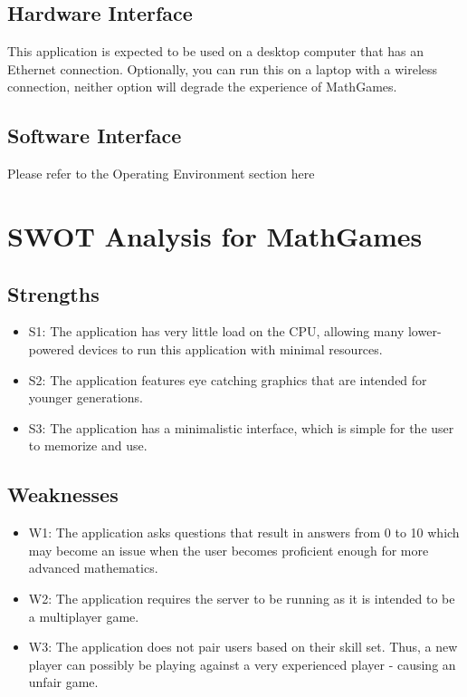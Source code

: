 \documentclass[12pt]{article}
\begin{document}
\subsection{Hardware Interface}

This application is expected to be used on a desktop computer that has an Ethernet connection.
Optionally, you can run this on a laptop with a wireless connection, neither option will degrade the experience of MathGames.

\subsection{Software Interface}

Please refer to the Operating Environment section here \underline{}

\newpage

\section{SWOT Analysis for MathGames}

\subsection{Strengths}

\begin{itemize}
\item S1: The application has very little load on the CPU, allowing many lower-powered devices to run this application with minimal resources.
\item S2: The application features eye catching graphics that are intended for younger generations.
\item S3: The application has a minimalistic interface, which is simple for the user to memorize and use.
\end{itemize}

\subsection{Weaknesses}

\begin{itemize}
\item W1: The application asks questions that result in answers from 0 to 10 which may become an issue when the user becomes proficient enough for more advanced mathematics.
\item W2: The application requires the server to be running as it is intended to be a multiplayer game.
\item W3: The application does not pair users based on their skill set. Thus, a new player can possibly be playing against a very experienced player - causing an unfair game.
\end{itemize}
\end{document}
